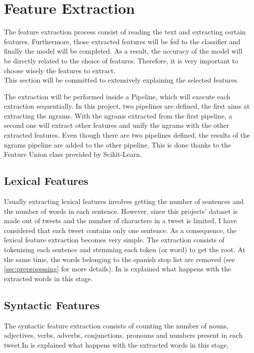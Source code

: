 \section{Feature Extraction}
 The feature extraction process consist of reading the text and extracting certain features. Furthermore, those extracted features will be fed to the classifier and finally the model will be completed. As a result, the accuracy of the model will be directly related to the choice of features. Therefore, it is very important to choose wisely the features to extract.\\
This section will be committed to extensively explaining the selected features.
\par
The extraction will be performed inside a Pipeline, which will execute each extraction sequentially. In this project, two pipelines are defined, the first aims at extracting the ngrams. With the ngrams extracted from the first pipeline, a second one will extract other features and unify the ngrams with the other extracted features. Even though there are two pipelines defined, the results of the ngrams pipeline are added to the other pipeline. This is done thanks to the Feature Union class provided by Scikit-Learn.
\subsection{Lexical Features}
Usually extracting lexical features involves getting the number of sentences and the number of words in each sentence. However, since this projects' dataset is made out of tweets and the number of characters in a tweet is limited, I have considered that each tweet contains only one sentence. As a consequence, the lexical feature extraction becomes very simple. The extraction consists of tokenizing each sentence and stemming each token (or word) to get the root. At the same time, the words belonging to the spanish stop list are removed (see \cref{sec:preprocessing} for more details). In  is explained what happens with the extracted words in this stage.
\subsection{Syntactic Features}
The syntactic feature extraction consists of counting the number of nouns, adjectives, verbs, adverbs, conjunctions, pronouns and numbers present in each tweet.In  is explained what happens with the extracted words in this stage.
